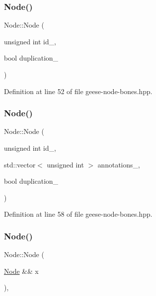 \subsubsection{\texorpdfstring{Node()}{Node()}\hspace{0.1cm}{\footnotesize\ttfamily [2/5]}}
{\footnotesize\ttfamily Node\+::\+Node (\begin{DoxyParamCaption}\item[{unsigned int}]{id\+\_\+,  }\item[{bool}]{duplication\+\_\+ }\end{DoxyParamCaption})\hspace{0.3cm}{\ttfamily [inline]}}



Definition at line 52 of file geese-\/node-\/bones.\+hpp.

\mbox{\label{class_node_a05edab5d06fba5a71443399343645553}} 
\subsubsection{\texorpdfstring{Node()}{Node()}\hspace{0.1cm}{\footnotesize\ttfamily [3/5]}}
{\footnotesize\ttfamily Node\+::\+Node (\begin{DoxyParamCaption}\item[{unsigned int}]{id\+\_\+,  }\item[{std\+::vector$<$ unsigned int $>$}]{annotations\+\_\+,  }\item[{bool}]{duplication\+\_\+ }\end{DoxyParamCaption})\hspace{0.3cm}{\ttfamily [inline]}}



Definition at line 58 of file geese-\/node-\/bones.\+hpp.

\mbox{\label{class_node_a7541702bb12f9dae3f6cbf83bddaed2a}} 
\subsubsection{\texorpdfstring{Node()}{Node()}\hspace{0.1cm}{\footnotesize\ttfamily [4/5]}}
{\footnotesize\ttfamily Node\+::\+Node (\begin{DoxyParamCaption}\item[{\hyperlink{class_node}{Node} \&\&}]{x }\end{DoxyParamCaption})\hspace{0.3cm}{\ttfamily [inline]}, {\ttfamily [noexcept]}}



